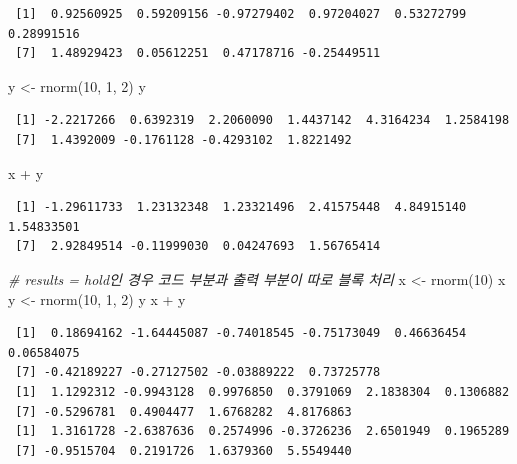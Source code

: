 \documentclass[
  11pt,
]{krantz}
\newenvironment{Shaded}{\begin{snugshade}}{\end{snugshade}}
\newcommand{\CommentTok}[1]{\textcolor[rgb]{0.37,0.37,0.37}{\textit{#1}}}
\newcommand{\DecValTok}[1]{\textcolor[rgb]{0.06,0.06,0.06}{#1}}
\newcommand{\FunctionTok}[1]{\textcolor[rgb]{0,0,0}{#1}}
\newcommand{\NormalTok}[1]{#1}
\newcommand{\OtherTok}[1]{\textcolor[rgb]{0.37,0.37,0.37}{#1}}
\newcommand{\SpecialCharTok}[1]{\textcolor[rgb]{0,0,0}{#1}}
\begin{document}
\begin{verbatim}
 [1]  0.92560925  0.59209156 -0.97279402  0.97204027  0.53272799  0.28991516
 [7]  1.48929423  0.05612251  0.47178716 -0.25449511
\end{verbatim}

\begin{Shaded}
\begin{Highlighting}[]
\NormalTok{y }\OtherTok{\textless{}{-}} \FunctionTok{rnorm}\NormalTok{(}\DecValTok{10}\NormalTok{, }\DecValTok{1}\NormalTok{, }\DecValTok{2}\NormalTok{)}
\NormalTok{y}
\end{Highlighting}
\end{Shaded}

\begin{verbatim}
 [1] -2.2217266  0.6392319  2.2060090  1.4437142  4.3164234  1.2584198
 [7]  1.4392009 -0.1761128 -0.4293102  1.8221492
\end{verbatim}

\begin{Shaded}
\begin{Highlighting}[]
\NormalTok{x }\SpecialCharTok{+}\NormalTok{ y}
\end{Highlighting}
\end{Shaded}

\begin{verbatim}
 [1] -1.29611733  1.23132348  1.23321496  2.41575448  4.84915140  1.54833501
 [7]  2.92849514 -0.11999030  0.04247693  1.56765414
\end{verbatim}

\normalsize

\footnotesize

\begin{Shaded}
\begin{Highlighting}[]
\CommentTok{\# results = \textquotesingle{}hold\textquotesingle{}인 경우 코드 부분과 출력 부분이 따로 블록 처리}
\NormalTok{x }\OtherTok{\textless{}{-}} \FunctionTok{rnorm}\NormalTok{(}\DecValTok{10}\NormalTok{)}
\NormalTok{x}
\NormalTok{y }\OtherTok{\textless{}{-}} \FunctionTok{rnorm}\NormalTok{(}\DecValTok{10}\NormalTok{, }\DecValTok{1}\NormalTok{, }\DecValTok{2}\NormalTok{)}
\NormalTok{y}
\NormalTok{x }\SpecialCharTok{+}\NormalTok{ y}
\end{Highlighting}
\end{Shaded}

\begin{verbatim}
 [1]  0.18694162 -1.64445087 -0.74018545 -0.75173049  0.46636454  0.06584075
 [7] -0.42189227 -0.27127502 -0.03889222  0.73725778
 [1]  1.1292312 -0.9943128  0.9976850  0.3791069  2.1838304  0.1306882
 [7] -0.5296781  0.4904477  1.6768282  4.8176863
 [1]  1.3161728 -2.6387636  0.2574996 -0.3726236  2.6501949  0.1965289
 [7] -0.9515704  0.2191726  1.6379360  5.5549440
\end{verbatim}
\end{document}
